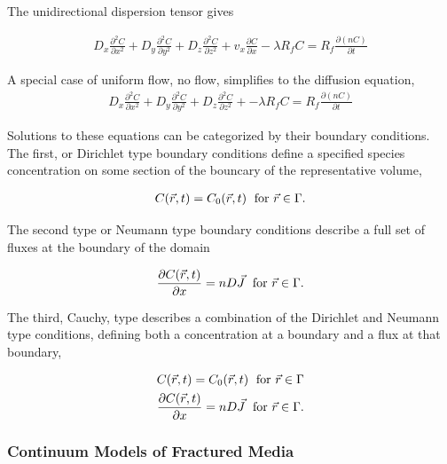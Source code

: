 {The unidirectional dispersion tensor gives 

\begin{align}
  D_x \frac{\partial^2 C}{\partial x^2} +
  D_y \frac{\partial^2 C}{\partial y^2} +
  D_z \frac{\partial^2 C}{\partial z^2} +
  v_x \frac{\partial C}{\partial x} - \lambda R_f C = R_f 
  \frac{\partial(nC)}{\partial t} 
  \label{unidirflow}
\end{align}

A special case of uniform flow, no flow, simplifies to the diffusion equation,
\begin{align}
  D_x \frac{\partial^2 C}{\partial x^2} +
  D_y \frac{\partial^2 C}{\partial y^2} +
  D_z \frac{\partial^2 C}{\partial z^2} +
  - \lambda R_f C = R_f 
  \frac{\partial(nC)}{\partial t} 
  \label{diffusion}
\end{align}

Solutions to these equations can be categorized by their boundary conditions. 
The first, or Dirichlet type boundary conditions define a specified species 
concentration on some section of the bouncary of the representative volume, 

\begin{align*}
  C(\vec{r},t) = C_0(\vec{r},t)\hspace{1mm}\mbox{ for } \vec{r} \in \Gamma.
\end{align*}

The second type or Neumann type boundary conditions describe a full set of 
fluxes at  the boundary of the domain

\begin{align*}
  \frac{\partial C(\vec{r},t)}{\partial x} = nD\vec{J} \hspace{1mm}\mbox{ for } \vec{r} \in \Gamma.
\end{align*}

The third, Cauchy, type describes a combination of the Dirichlet and Neumann 
type conditions, defining both a concentration at a boundary and a flux at that 
boundary, 

\begin{align*}
  C(\vec{r},t) = C_0(\vec{r},t)\hspace{1mm}\mbox{ for } \vec{r} \in \Gamma\\
  \frac{\partial C(\vec{r},t)}{\partial x} = nD\vec{J} \hspace{1mm}\mbox{ for } \vec{r} \in \Gamma.
\end{align*}

\subsubsection{Continuum Models of Fractured Media} 

}
